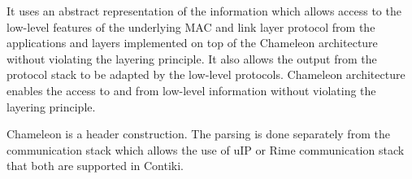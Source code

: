 It uses an abstract representation of the information which allows access to the low-level features of the underlying MAC and link layer protocol from the applications and layers implemented on top of the Chameleon architecture without violating the layering principle. It also allows the output from the protocol stack to be adapted by the low-level protocols.
Chameleon architecture enables the access to and from low-level information without violating the layering principle. 




Chameleon is a header construction. The parsing is done separately from the communication stack which allows the use of uIP or Rime communication stack that both are supported in Contiki.



